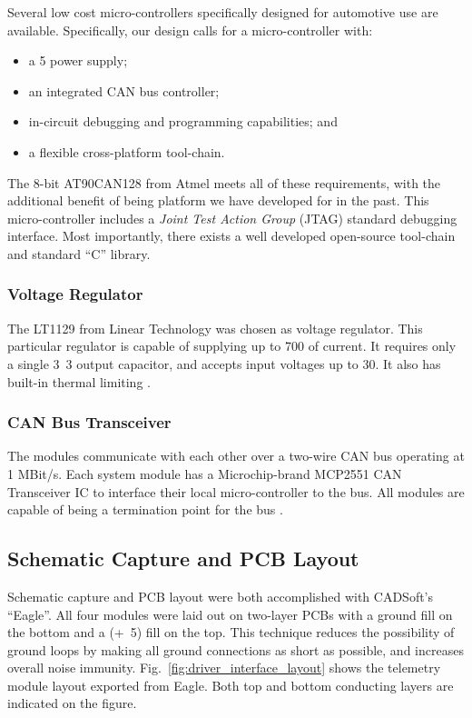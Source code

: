 Several low cost micro-controllers specifically designed for automotive use are available. Specifically, our design calls for a micro-controller with:

\begin{itemize}
  \item a \unit{5}{\volt} power supply;
  \item an integrated CAN bus controller;
  \item in-circuit debugging and programming capabilities; and
  \item a flexible cross-platform tool-chain.
\end{itemize}


The 8-bit AT90CAN128 from Atmel meets all of these requirements, with the additional benefit of being platform we have developed for in the past. This micro-controller includes a \emph{Joint Test Action Group} (JTAG) standard debugging interface. Most importantly, there exists a well developed open-source tool-chain and standard ``C'' library.

\subsubsection{Voltage Regulator}

The LT1129 from Linear Technology was chosen as voltage regulator. This particular regulator is capable of supplying up to \unit{700}{\milli\ampere} of current. It requires only a single \unit{3.3}{\micro\farad} output capacitor, and accepts input voltages up to \unit{30}{\volt}. It also has built-in thermal limiting \cite{LTC1129}.

\subsubsection{CAN Bus Transceiver}

The modules communicate with each other over a two-wire CAN bus operating at 1 MBit/s. Each system module has a Microchip-brand MCP2551 CAN Transceiver IC to interface their local micro-controller to the bus. All modules are capable of being a termination point for the bus \cite{MCP2551}. 

\subsection{Schematic Capture and PCB Layout}

Schematic capture and PCB layout were both accomplished with CADSoft's ``Eagle''. All four modules were laid out on two-layer PCBs with a ground fill on the bottom and a (\unit{+5}{\volt}) fill on the top. This technique reduces the possibility of ground loops by making all ground connections as short as possible, and increases overall noise immunity. Fig.\ \ref{fig:driver_interface_layout} shows the telemetry module layout exported from Eagle. Both top and bottom conducting layers are indicated on the figure.

